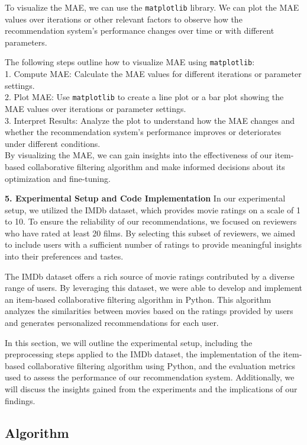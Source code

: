 \documentclass[conference]{IEEEtran}
\begin{document}
	To visualize the MAE, we can use the \texttt{matplotlib} library. We can plot the MAE values over iterations or other relevant factors to observe how the recommendation system's performance changes over time or with different parameters.
	
	The following steps outline how to visualize MAE using \texttt{matplotlib}:\\
	1. Compute MAE: Calculate the MAE values for different iterations or parameter settings.\\
	2. Plot MAE: Use \texttt{matplotlib} to create a line plot or a bar plot showing the MAE values over iterations or parameter settings.\\
	3. Interpret Results: Analyze the plot to understand how the MAE changes and whether the recommendation system's performance improves or deteriorates under different conditions.\\
	
	By visualizing the MAE, we can gain insights into the effectiveness of our item-based collaborative filtering algorithm and make informed decisions about its optimization and fine-tuning.
	
	
	\textbf{5. Experimental Setup and Code Implementation}
	In our experimental setup, we utilized the IMDb dataset, which provides movie ratings on a scale of 1 to 10. To ensure the reliability of our recommendations, we focused on reviewers who have rated at least 20 films. By selecting this subset of reviewers, we aimed to include users with a sufficient number of ratings to provide meaningful insights into their preferences and tastes.
	
	The IMDb dataset offers a rich source of movie ratings contributed by a diverse range of users. By leveraging this dataset, we were able to develop and implement an item-based collaborative filtering algorithm in Python. This algorithm analyzes the similarities between movies based on the ratings provided by users and generates personalized recommendations for each user.
	
	In this section, we will outline the experimental setup, including the preprocessing steps applied to the IMDb dataset, the implementation of the item-based collaborative filtering algorithm using Python, and the evaluation metrics used to assess the performance of our recommendation system. Additionally, we will discuss the insights gained from the experiments and the implications of our findings.
	
	\subsection {Algorithm}
	
\end{document}
